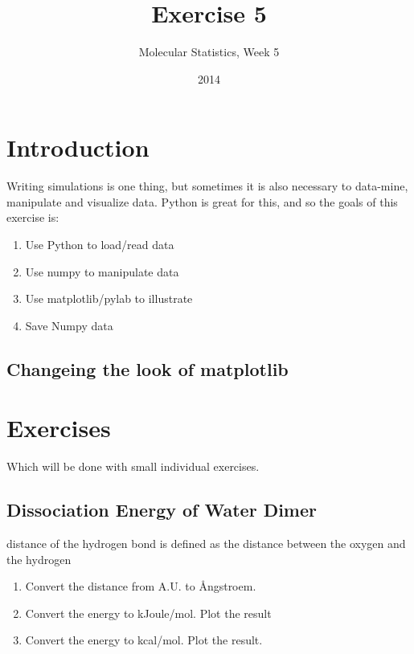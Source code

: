 \documentclass{article}
\title{Exercise 5}
\author{Molecular Statistics, Week 5}
\date{2014}
\begin{document}

\maketitle

\section{Introduction}

Writing simulations is one thing, but sometimes it is also necessary to data-mine, manipulate and visualize data.
Python is great for this, and so the goals of this exercise is:

\begin{enumerate}
    \item Use Python to load/read data

    \item Use numpy to manipulate data

    \item Use matplotlib/pylab to illustrate 

    \item Save Numpy data

\end{enumerate}


\subsection{Changeing the look of matplotlib}







\newpage
\section{Exercises}

Which will be done with small individual exercises.

\subsection{Dissociation Energy of Water Dimer}

distance of the hydrogen bond is defined as the distance between the oxygen and the hydrogen

\begin{enumerate}

    \item Convert the distance from A.U. to \AA ngstroem.

    \item Convert the energy to kJoule/mol. Plot the result

    \item Convert the energy to kcal/mol. Plot the result.

\end{enumerate}
\end{document}
